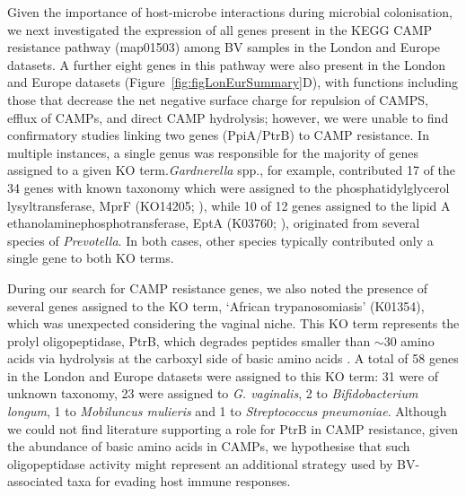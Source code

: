 \documentclass[sn-mathphys,Numbered]{sn-jnl}%
\begin{document}
Given the importance of host-microbe interactions during microbial colonisation, we next investigated the expression of all genes present in the KEGG CAMP resistance pathway (map01503) among BV samples in the London and Europe datasets. A further eight genes in this pathway were also present in the London and Europe datasets (Figure~\ref{fig:figLonEurSummary}D), with functions including those that decrease the net negative surface charge for repulsion of CAMPS, efflux of CAMPs, and direct CAMP hydrolysis; however, we were unable to find confirmatory studies linking two genes (PpiA/PtrB) to CAMP resistance. In multiple instances, a single genus was responsible for the majority of genes assigned to a given KO term.\textit{Gardnerella} spp., for example, contributed 17 of the 34 genes with known taxonomy which were assigned to the phosphatidylglycerol lysyltransferase, MprF (KO14205; \citep{ernst_bacterial_2009}), while 10 of 12 genes assigned to the lipid A ethanolaminephosphotransferase, EptA (K03760; \citep{raetz_lipid_2007}), originated from several species of \textit{Prevotella}. In both cases, other species typically contributed only a single gene to both KO terms.

During our search for CAMP resistance genes, we also noted the presence of several genes assigned to the KO term, `African trypanosomiasis' (K01354), which was unexpected considering the vaginal niche. This KO term represents the prolyl oligopeptidase, PtrB, which degrades peptides smaller than $\sim$30 amino acids via hydrolysis at the carboxyl side of basic amino acids \citep{coetzer_oligopeptidase_2008}. A total of 58 genes in the London and Europe datasets were assigned to this KO term: 31 were of unknown taxonomy, 23 were assigned to \textit{G. vaginalis}, 2 to \textit{Bifidobacterium longum}, 1 to \textit{Mobiluncus mulieris} and 1 to \textit{Streptococcus pneumoniae}. Although we could not find literature supporting a role for PtrB in CAMP resistance, given the abundance of basic amino acids in CAMPs, we hypothesise that such oligopeptidase activity might represent an additional strategy used by BV-associated taxa for evading host immune responses.
\end{document}
